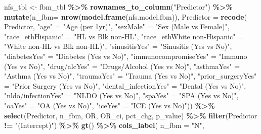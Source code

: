 \documentclass[
]{article}
\newenvironment{Shaded}{\begin{snugshade}}{\end{snugshade}}
\newcommand{\AttributeTok}[1]{\textcolor[rgb]{0.13,0.29,0.53}{#1}}
\newcommand{\FunctionTok}[1]{\textcolor[rgb]{0.13,0.29,0.53}{\textbf{#1}}}
\newcommand{\NormalTok}[1]{#1}
\newcommand{\OtherTok}[1]{\textcolor[rgb]{0.56,0.35,0.01}{#1}}
\newcommand{\SpecialCharTok}[1]{\textcolor[rgb]{0.81,0.36,0.00}{\textbf{#1}}}
\newcommand{\StringTok}[1]{\textcolor[rgb]{0.31,0.60,0.02}{#1}}
\begin{document}
\begin{Shaded}
\begin{Highlighting}[]
\NormalTok{nfs\_tbl }\OtherTok{\textless{}{-}}\NormalTok{ fbm\_tbl }\SpecialCharTok{\%\textgreater{}\%}
  \FunctionTok{rownames\_to\_column}\NormalTok{(}\StringTok{"Predictor"}\NormalTok{) }\SpecialCharTok{\%\textgreater{}\%} 
  \FunctionTok{mutate}\NormalTok{(}\AttributeTok{n\_fbm=} \FunctionTok{nrow}\NormalTok{(}\FunctionTok{model.frame}\NormalTok{(nfs.model.fbm)),}
      \AttributeTok{Predictor =} \FunctionTok{recode}\NormalTok{(}
\NormalTok{        Predictor,}
        \StringTok{"age"} \OtherTok{=} \StringTok{"Age (per 1yr)"}\NormalTok{,}
        \StringTok{"sexMale"} \OtherTok{=} \StringTok{"Sex (Male vs Female)"}\NormalTok{,}
        \StringTok{"race\_ethHispanic"} \OtherTok{=} \StringTok{"HL vs Blk non{-}HL"}\NormalTok{,}
        \StringTok{"race\_ethWhite non{-}Hispanic"} \OtherTok{=} \StringTok{"White non{-}HL vs Blk non{-}HL)"}\NormalTok{,}
        \StringTok{"sinusitisYes"} \OtherTok{=} \StringTok{"Sinusitis (Yes vs No)"}\NormalTok{,}
        \StringTok{"diabetesYes"} \OtherTok{=} \StringTok{"Diabetes (Yes vs No)"}\NormalTok{,}
        \StringTok{"immunocompromiseYes"} \OtherTok{=} \StringTok{"Immuno (Yes vs No)"}\NormalTok{,}
        \StringTok{"\textasciigrave{}drug/alc\textasciigrave{}Yes"} \OtherTok{=} \StringTok{"Drugs/Alcohol (Yes vs No)"}\NormalTok{,}
        \StringTok{"asthmaYes"} \OtherTok{=} \StringTok{"Asthma (Yes vs No)"}\NormalTok{,}
        \StringTok{"traumaYes"} \OtherTok{=} \StringTok{"Trauma (Yes vs No)"}\NormalTok{,}
        \StringTok{"prior\_surgeryYes"} \OtherTok{=} \StringTok{"Prior Surgery (Yes vs No)"}\NormalTok{,}
        \StringTok{"dental\_infectionYes"} \OtherTok{=} \StringTok{"Dental (Yes vs No)"}\NormalTok{,}
        \StringTok{"\textasciigrave{}nldo/infection\textasciigrave{}Yes"} \OtherTok{=} \StringTok{"NLDO (Yes vs No)"}\NormalTok{,}
        \StringTok{"spaYes"} \OtherTok{=} \StringTok{"SPA (Yes vs No)"}\NormalTok{,}
        \StringTok{"oaYes"} \OtherTok{=} \StringTok{"OA (Yes vs No)"}\NormalTok{,}
        \StringTok{"iceYes"} \OtherTok{=} \StringTok{"ICE (Yes vs No)"}\NormalTok{)) }\SpecialCharTok{\%\textgreater{}\%} 
  \FunctionTok{select}\NormalTok{(Predictor, n\_fbm, OR, OR\_ci, pct\_chg, p\_value) }\SpecialCharTok{\%\textgreater{}\%}
  \FunctionTok{filter}\NormalTok{(Predictor }\SpecialCharTok{!=} \StringTok{"(Intercept)"}\NormalTok{) }\SpecialCharTok{\%\textgreater{}\%} 
  \FunctionTok{gt}\NormalTok{() }\SpecialCharTok{\%\textgreater{}\%}
  \FunctionTok{cols\_label}\NormalTok{(}
    \AttributeTok{n\_fbm =} \StringTok{"N"}\NormalTok{, }

\end{Highlighting}
\end{Shaded}
\end{document}
